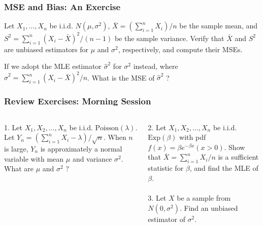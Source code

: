 \documentclass{beamer}
\begin{document}
\begin{frame}
\frametitle{MSE and Bias: An Exercise}
Let $X_1,\ldots,X_n$ be i.i.d. $N(\mu,\sigma^2)$, $\bar{X}=(\sum_{i=1}^n X_i)/n$ be the sample mean, and $S^2=\sum_{i=1}^n (X_i-\bar{X})^2/(n-1)$ be the sample variance. Verify that $\bar{X}$ and $S^2$ are unbiased estimators for $\mu$ and $\sigma^2$, respectively, and compute their MSEs.
\vspace*{1in}

If we adopt the MLE estimator $\hat{\sigma}^2$ for $\sigma^2$ instead, where $\hat{\sigma}^2=\sum_{i=1}^n (X_i-\bar{X})^2/n$. What is the MSE of $\hat{\sigma}^2$ ?
\vspace*{0.6in}
\end{frame}


\begin{frame}
\frametitle{Review Exercises: Morning Session}
\begin{columns}[t]
1. Let $X_1,X_2,\ldots,X_n$ be i.i.d. $\text{Poisson}(\lambda)$. Let $Y_n = (\sum_{i=1}^n X_i - \lambda)/\sqrt{n}$. When $n$ is large, $Y_n$ is approximately a normal variable with mean $\mu$ and variance $\sigma^2$. What are $\mu$ and $\sigma^2$ ?

2. Let $X_1,X_2,\ldots,X_n$ be i.i.d. $\text{Exp}(\beta)$ with pdf $f(x)=\beta e^{-\beta x} (x > 0)$. Show that $\bar{X} = \sum_{i=1}^n X_i/n$ is a sufficient statistic for $\beta$, and find the MLE of $\beta$.
\\~\\
3. Let $X$ be a sample from $N(0,\sigma^2)$. Find an unbiased estimator of $\sigma^2$.

\end{columns}
\end{frame}
\end{document}

